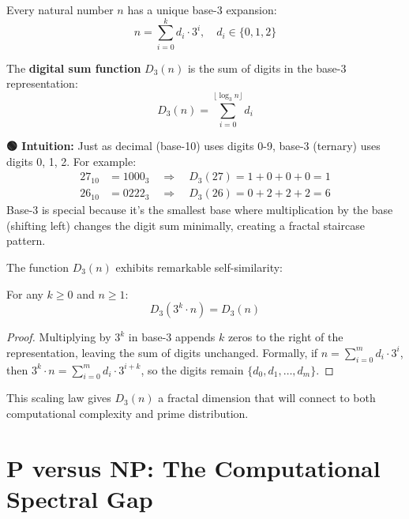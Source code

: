Every natural number $n$ has a unique base-3 expansion:
\begin{equation}
n = \sum_{i=0}^{k} d_i \cdot 3^i, \quad d_i \in \{0, 1, 2\}
\end{equation}

\begin{definition}
\label{def:digital_sum}
The \textbf{digital sum function} $D_3(n)$ is the sum of digits in the base-3 representation:
\begin{equation}
D_3(n) = \sum_{i=0}^{\lfloor \log_3 n \rfloor} d_i
\end{equation}
\end{definition}

\begin{greenbox}
\textbf{🟢 Intuition:} Just as decimal (base-10) uses digits 0-9, base-3 (ternary) uses digits 0, 1, 2. For example:
\begin{align*}
27_{10} &= 1000_3 \quad \Rightarrow \quad D_3(27) = 1 + 0 + 0 + 0 = 1 \\
26_{10} &= 0222_3 \quad \Rightarrow \quad D_3(26) = 0 + 2 + 2 + 2 = 6
\end{align*}
Base-3 is special because it's the smallest base where multiplication by the base (shifting left) changes the digit sum minimally, creating a fractal staircase pattern.
\end{greenbox}

The function $D_3(n)$ exhibits remarkable self-similarity:

\begin{lemma}
\label{lem:d3_scaling}
For any $k \geq 0$ and $n \geq 1$:
\begin{equation}
D_3(3^k \cdot n) = D_3(n)
\end{equation}
\end{lemma}

\begin{proof}
Multiplying by $3^k$ in base-3 appends $k$ zeros to the right of the representation, leaving the sum of digits unchanged. Formally, if $n = \sum_{i=0}^{m} d_i \cdot 3^i$, then $3^k \cdot n = \sum_{i=0}^{m} d_i \cdot 3^{i+k}$, so the digits remain $\{d_0, d_1, \ldots, d_m\}$.
\end{proof}

This scaling law gives $D_3(n)$ a fractal dimension that will connect to both computational complexity and prime distribution.

\section{P versus NP: The Computational Spectral Gap}

